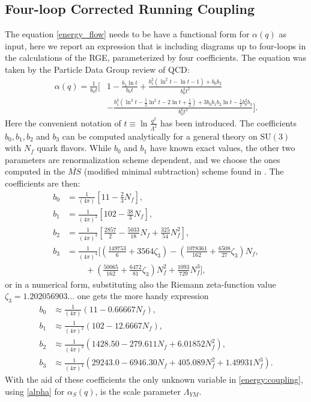 \subsection{Four-loop Corrected Running Coupling}
\label{sec:4loop}
The equation \cref{energy_flow} needs to be have a functional form for $\alpha(q)$ as input, here we report an expression that is including diagrams up to four-loops in the calculations of the RGE, parameterized by four coefficients. The equation was taken by the Particle Data Group review of QCD\cite{dissertori_9._2016}:
\begin{align}
    \label{alpha}
    \alpha(q) = \frac{1}{b_0t} \bigg[& 1 - \frac{b_1\ln t}{b_0t}  + \frac{b_1^2(\ln^2t - \ln t - 1) + b_0b_2}{b_0^4t^2}\\\nonumber
    & - \frac{b_1^3(\ln^3t - \frac{5}{2}\ln^2 t - 2\ln t + \frac{1}{2}) + 3b_0b_1b_2\ln t - \frac{1}{2}b_0^2b_3}{b_0^6t^3}\bigg].
\end{align}
Here the convenient notation of $t\equiv\ln\frac{q^2}{\Lambda^2}$ has been introduced. The coefficients $b_0, b_1,b_2$ and $b_3$ can be computed analytically for a general theory on $\mathrm{SU}(3)$ with $N_f$ quark flavors. While $b_0$ and $b_1$ have known exact values, the other two parameters are renormalization scheme dependent, and we choose the ones computed in the $\overline{MS}$ (modified minimal subtraction) scheme found in \cite{van_ritbergen_four-loop_1997}. The coefficients are then: 
\begin{align}
    b_0 &= \frac{1}{(4\pi)}   \left[11 - \frac{2}{3}N_f\right], \\\nonumber
    b_1 &= \frac{1}{(4\pi)^2} \left[102 - \frac{38}{3}N_f\right] ,\\\nonumber
    b_2 &= \frac{1}{(4\pi)^3} \left[\frac{2857}{2} - \frac{5033}{18}N_f + \frac{325}{54}N_f^2\right] ,\\\nonumber
    b_3 &= \frac{1}{(4\pi)^4} \bigg[\left(\frac{149753}{6} + 3564\zeta_3\right)  - \left(\frac{1078361}{162}+ \frac{6508}{27}\zeta_3\right) N_f , \\\nonumber
    & ~~~~~~~~~~+ \left(\frac{50065}{162}  + \frac{6472}{81}\zeta_3\right)N_f^2 + \frac{1093}{729}N_f^3 \bigg], 
\end{align} 
or in a numerical form, substituting also the Riemann zeta-function value $\zeta_3 = 1.202056903\dots$ one gets the more handy expression
\begin{align}
    \label{b:coeffs}
    b_0 &\approx \frac{1}{(4\pi)} (11-0.66667N_f),\\\nonumber
    b_1 &\approx \frac{1}{(4\pi)^2} (102-12.6667N_f),\\\nonumber
    b_2 &\approx \frac{1}{(4\pi)^3} (1428.50-279.611N_f+ 6.01852N_f^2),\\\nonumber
    b_3 &\approx \frac{1}{(4\pi)^4} (29243.0-6946.30N_f+ 405.089N_f^2+ 1.49931N_f^3).
\end{align}
With the aid of these coefficients the only unknown variable in \cref{energy:coupling}, using \cref{alpha} for $\alpha_S(q)$, is the scale parameter $\Lambda_{YM}$.